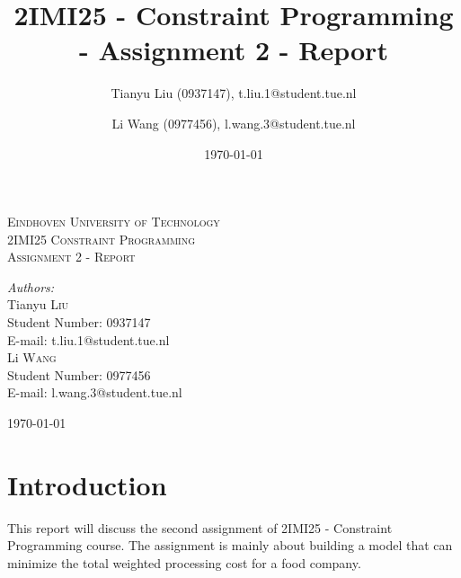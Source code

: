\documentclass[a4paper, 12pt]{article}
\title{2IMI25 - Constraint Programming - Assignment 2 - Report}
\author{Tianyu Liu (0937147), t.liu.1@student.tue.nl \and Li Wang (0977456), l.wang.3@student.tue.nl}
\date{\today}
\newcommand{\twoline}{\vspace{2ex}}
\begin{document}
\begin{titlepage}
	\newcommand{\HRule}{\rule{\linewidth}{0.5mm}} %
	\centering
	\textsc{\LARGE Eindhoven University of Technology}\\[1.5cm]
	\textsc{\Large 2IMI25 Constraint Programming}\\[1.5cm]
	\textsc{\large Assignment 2 - Report}\\[3cm]
	\begin{minipage}{0.4\textwidth}
		\begin{flushleft} \large
			\emph{Authors:}\\ [0.5cm]
			Tianyu \textsc{Liu}\\
			Student Number: 0937147\\
			E-mail: t.liu.1@student.tue.nl\\ [0.2cm]
			Li \textsc{Wang}\\
			Student Number: 0977456\\
			E-mail: l.wang.3@student.tue.nl\\ [0.2cm]
		\end{flushleft}
	\end{minipage}
	
	\vspace{15ex}
	{\large \today}\\[3cm] %
	\vfill
\end{titlepage}

\setcounter{page}{1} 

\tableofcontents

\newpage 


\section{Introduction}

This report will discuss the second assignment of 2IMI25 - Constraint Programming course. The assignment is mainly about building a model that can minimize the total weighted processing cost for a food company. 
\twoline 
\end{document}
